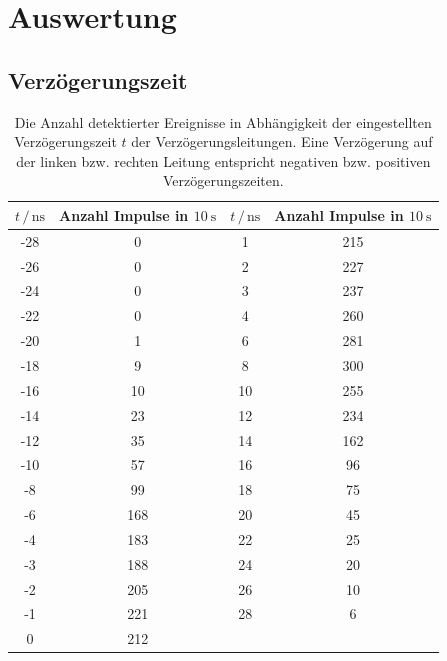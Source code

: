 \section{Auswertung}
\label{sec:Auswertung}

\subsection{Verzögerungszeit}
\begin{table}
    \centering
    \caption{Die Anzahl detektierter Ereignisse in Abhängigkeit der eingestellten Verzögerungszeit $t$ der Verzögerungsleitungen.
    Eine Verzögerung auf der linken bzw. rechten Leitung entspricht negativen bzw. positiven Verzögerungszeiten.
    }
    \label{tab:verzoegerung}
    \begin{tabular}{cc|cc}
        \toprule
        $t \,/\, \unit{\nano\second}$ & Anzahl Impulse in $\qty{10}{\second}$ & $t \,/\, \unit{\nano\second}$ & Anzahl Impulse in $\qty{10}{\second}$ \\
        \midrule
        -28 & 0 & 1 & 215 \\
        -26 & 0 & 2 & 227 \\
        -24 & 0 & 3 & 237 \\
        -22 & 0 & 4 & 260 \\
        -20 & 1 & 6 & 281 \\
        -18 & 9 & 8 & 300 \\
        -16 & 10 & 10 & 255 \\
        -14 & 23 & 12 & 234 \\
        -12 & 35 & 14 & 162 \\
        -10 & 57 & 16 & 96 \\
        -8 & 99 & 18 & 75 \\
        -6 & 168 & 20 & 45 \\
        -4 & 183 & 22 & 25 \\
        -3 & 188 & 24 & 20 \\
        -2 & 205 & 26 & 10 \\
        -1 & 221 & 28 & 6 \\
        0 & 212 & & \\

        \bottomrule
    \end{tabular}
\end{table}


